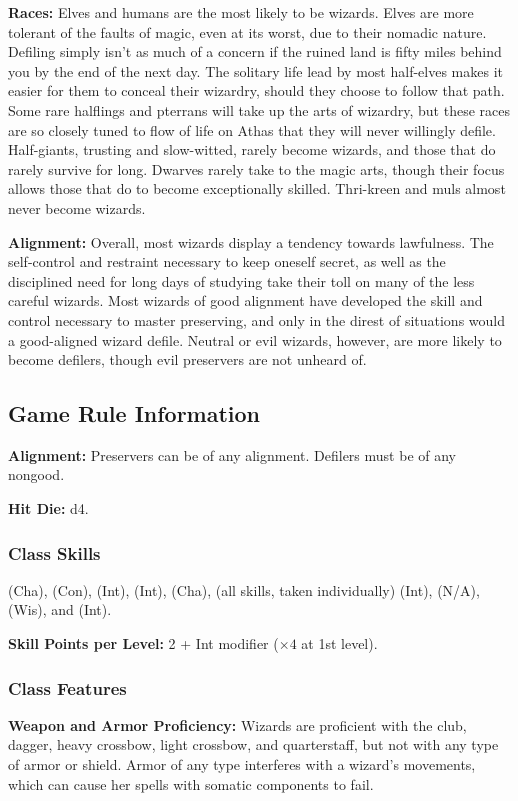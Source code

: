\textbf{Races:} Elves and humans are the most likely to be wizards. Elves are more tolerant of the faults of magic, even at its worst, due to their nomadic nature. Defiling simply isn't as much of a concern if the ruined land is fifty miles behind you by the end of the next day. The solitary life lead by most half-elves makes it easier for them to conceal their wizardry, should they choose to follow that path. Some rare halflings and pterrans will take up the arts of wizardry, but these races are so closely tuned to flow of life on Athas that they will never willingly defile. Half-giants, trusting and slow-witted, rarely become wizards, and those that do rarely survive for long. Dwarves rarely take to the magic arts, though their focus allows those that do to become exceptionally skilled. Thri-kreen and muls almost never become wizards.

\textbf{Alignment:} Overall, most wizards display a tendency towards lawfulness. The self-control and restraint necessary to keep oneself secret, as well as the disciplined need for long days of studying take their toll on many of the less careful wizards. Most wizards of good alignment have developed the skill and control necessary to master preserving, and only in the direst of situations would a good-aligned wizard defile. Neutral or evil wizards, however, are more likely to become defilers, though evil preservers are not unheard of.

\subsection{Game Rule Information}

\textbf{Alignment:} Preservers can be of any alignment. Defilers must be of any nongood.

\textbf{Hit Die:} d4.

\subsubsection{Class Skills}
 (Cha),  (Con),  (Int),  (Int),  (Cha),  (all skills, taken individually) (Int),  (N/A),  (Wis), and  (Int).

\textbf{Skill Points per Level:} 2 + Int modifier ($\times4$ at 1st level).


\subsubsection{Class Features}
\textbf{Weapon and Armor Proficiency:} Wizards are proficient with the club, dagger, heavy crossbow, light crossbow, and quarterstaff, but not with any type of armor or shield. Armor of any type interferes with a wizard's movements, which can cause her spells with somatic components to fail.

